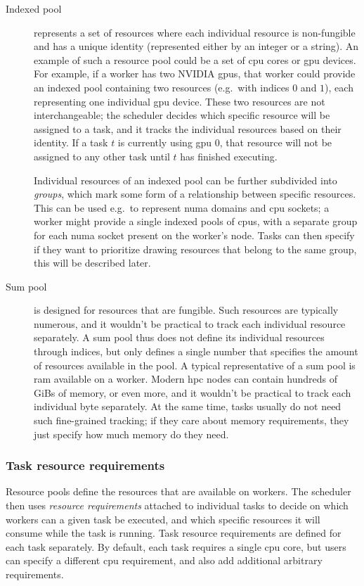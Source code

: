 \begin{description}
	\item [Indexed pool] represents a set of resources where each individual resource is
	      non-fungible and has a unique identity (represented either by an integer or a string). An example
	      of such a resource pool could be a set of \gls{cpu} cores or \gls{gpu}
	      devices. For example, if a worker has two NVIDIA \glspl{gpu}, that worker could provide
	      an indexed pool containing two resources (e.g.\ with indices $0$ and
	      $1$), each representing one individual \gls{gpu} device. These two
	      resources are not interchangeable; the scheduler decides which specific resource will be assigned
	      to a task, and it tracks the individual resources based on their identity. If a task
	      $t$ is currently using \gls{gpu} $0$, that
	      resource will not be assigned to any other task until $t$ has finished executing.

	      Individual resources of an indexed pool can be further subdivided into \emph{groups},
	      which mark some form of a relationship between specific resources. This can be used e.g.\ to
	      represent \gls{numa} domains and \gls{cpu} sockets; a worker might provide
	      a single indexed pools of \glspl{cpu}, with a separate group for each
	      \gls{numa} socket present on the worker's node. Tasks can then specify if they want to
	      prioritize drawing resources that belong to the same group, this will be described later.
	\item [Sum pool] is designed for resources that are fungible. Such resources are typically
	      numerous, and it wouldn't be practical to track each individual resource separately. A sum pool
	      thus does not define its individual resources through indices, but only defines a single number
	      that specifies the amount of resources available in the pool. A typical representative of a sum
	      pool is \gls{ram} available on a worker. Modern \gls{hpc} nodes can
	      contain hundreds of GiBs of memory, or even more, and it wouldn't be practical to track each
	      individual byte separately. At the same time, tasks usually do not need such fine-grained tracking;
	      if they care about memory requirements, they just specify how much memory do they need.
\end{description}


\subsubsection*{Task resource requirements}
Resource pools define the resources that are available on workers. The scheduler then uses
\emph{resource requirements} attached to individual tasks to decide on which workers can a given task be
executed, and which specific resources it will consume while the task is running. Task resource
requirements are defined for each task separately. By default, each task requires a single
\gls{cpu} core, but users can specify a different \gls{cpu}
requirement, and also add additional arbitrary requirements.

